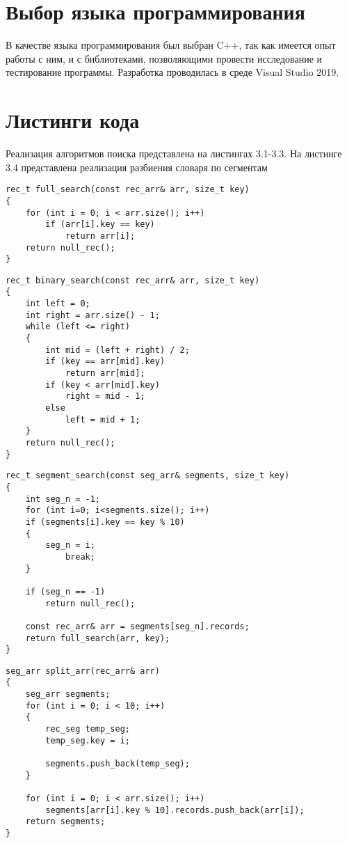 \section{Выбор языка программирования}
В качестве языка программирования был выбран C++\cite{C++_Doc}, так как имеется опыт работы с ним, и с библиотеками, позволяющими провести исследование и тестирование программы. Разработка проводилась в среде Visual Studio 2019\cite{VisualStudio}.

\section{Листинги кода}
Реализация алгоритмов поиска представлена на листингах 3.1-3.3. На листинге 3.4 представлена реализация разбиения словаря по сегментам

\begin{lstlisting}[caption = {Поиск полным перебором}]
rec_t full_search(const rec_arr& arr, size_t key)
{
	for (int i = 0; i < arr.size(); i++)
		if (arr[i].key == key)
			return arr[i];
	return null_rec();
}
\end{lstlisting}

\begin{lstlisting}[caption = {Поиск половинным разбиением}]
rec_t binary_search(const rec_arr& arr, size_t key)
{
	int left = 0;
	int right = arr.size() - 1;
	while (left <= right)
	{
		int mid = (left + right) / 2;
		if (key == arr[mid].key)
			return arr[mid];
		if (key < arr[mid].key)
			right = mid - 1;  
		else                  
			left = mid + 1;   
	}
	return null_rec();
}
\end{lstlisting}

\begin{lstlisting}[caption = {Поиск с сегментами}]
rec_t segment_search(const seg_arr& segments, size_t key)
{
	int seg_n = -1;
	for (int i=0; i<segments.size(); i++)
	if (segments[i].key == key % 10)
	{
		seg_n = i;
			break;
	}
	
	if (seg_n == -1)
		return null_rec();
	
	const rec_arr& arr = segments[seg_n].records;
	return full_search(arr, key);
}
\end{lstlisting}

\begin{lstlisting}[caption = {Разбиение словаря по сегментам}]
seg_arr split_arr(rec_arr& arr)
{
	seg_arr segments;
	for (int i = 0; i < 10; i++)
	{
		rec_seg temp_seg;
		temp_seg.key = i;
		
		segments.push_back(temp_seg);
	}
	
	for (int i = 0; i < arr.size(); i++)
		segments[arr[i].key % 10].records.push_back(arr[i]);
	return segments;
}
\end{lstlisting}


